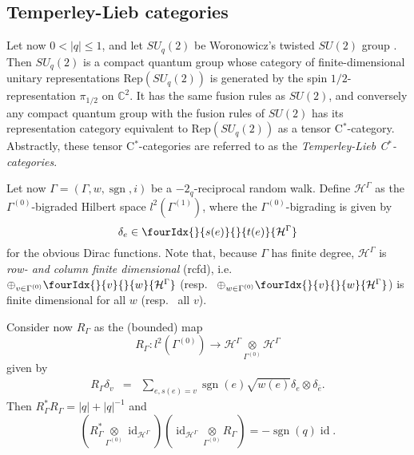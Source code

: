 \documentclass[11pt]{article}
\DeclareMathOperator{\id}{id}
\DeclareMathOperator{\sgn}{\mathrm{sgn}}
\newcommand{\C}{\mathbb{C}}
\newcommand{\Hsp}{\mathcal{H}}
\newcommand{\Rep}{\mathrm{Rep}}
\newcommand{\Gr}[5]{\fourIdx{#2}{#4}{#3}{#5}{#1}}%
\newcommand{\Gru}[3]{\Gr{#1}{}{}{#2}{#3}}
\theoremstyle{definition}
\numberwithin{equation}{section}
\begin{document}
\subsection{Temperley-Lieb categories}

Let now $0<|q|\leq 1$, and let $SU_q(2)$ be Woronowicz's twisted $SU(2)$ group \cite{Wor1}. Then $SU_q(2)$ is a compact quantum group whose category of finite-dimensional unitary representations $\Rep(SU_q(2))$ is generated by the spin $1/2$-representation $\pi_{1/2}$ on $\C^2$. It has the same fusion rules as $SU(2)$, and conversely any compact quantum group with the fusion rules of $SU(2)$ has its representation category equivalent to $\Rep(SU_q(2))$ as a tensor C$^*$-category. Abstractly, these tensor C$^*$-categories are referred to as the \emph{Temperley-Lieb C$^*$-categories}.

Let now $\Gamma = (\Gamma,w,\sgn,i)$ be a $-2_q$-reciprocal random walk. Define $\Hsp^{\Gamma}$ as the $\Gamma^{(0)}$-bigraded Hilbert space $l^2(\Gamma^{(1)})$, where the $\Gamma^{(0)}$-bigrading is given by \[\delta_e \in \Gru{\Hsp^{\Gamma}}{s(e)}{t(e)}\] for the obvious Dirac functions. Note that, because $\Gamma$ has finite degree, $\Hsp^{\Gamma}$ is \emph{row- and column finite dimensional} (rcfd), i.e.~ $\oplus_{v\in \Gamma^{(0)}} \Gru{\Hsp^{\Gamma}}{v}{w}$ (resp.~ $\oplus_{w\in \Gamma^{(0)}} \Gru{\Hsp^{\Gamma}}{v}{w}$) is finite dimensional for all $w$ (resp.~ all $v$). 

Consider now $R_{\Gamma}$ as the (bounded) map \[R_{\Gamma}:l^2(\Gamma^{(0)})\rightarrow \Hsp^{\Gamma}\underset{\Gamma^{(0)}}{\otimes} \Hsp^{\Gamma}\] given by \begin{eqnarray*} R_{\Gamma} \delta_v &=& \sum_{e,s(e) = v} \sgn(e)\sqrt{w(e)}\delta_e \otimes \delta_{\bar{e}}.\end{eqnarray*} Then $R_{\Gamma}^*R_{\Gamma} = |q|+|q|^{-1}$ and \[(R_{\Gamma}^*\underset{\Gamma^{(0)}}{\otimes} \id_{\Hsp^{\Gamma}})(\id_{\Hsp^{\Gamma}}\underset{\Gamma^{(0)}}{\otimes} R_{\Gamma}) = -\sgn(q)\id.\]



\end{document}
